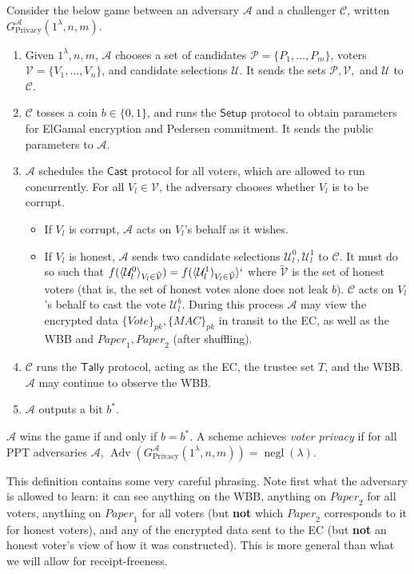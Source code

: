 \documentclass[12pt,a4paper]{article}
\DeclareMathOperator{\negl}{\text{negl}}
\DeclareMathOperator{\Adv}{\text{Adv}}
\theoremstyle{definition}
\newcommand{\Vote}{\mathit{Vote}}
\newcommand{\Paper}{\mathit{Paper}}
\newcommand{\Mac}{\mathit{MAC}}
\begin{document}
\begin{definition}
    Consider the below game between an adversary $\mathcal{A}$ and a challenger $\mathcal{C}$, written $G^\mathcal{A}_{\text{Privacy}}(1^\lambda, n, m)$.
    \begin{enumerate}
        \item Given $1^\lambda, n, m$, $\mathcal{A}$ chooses a set of candidates $\mathcal{P}=\{P_1,\ldots,P_m\}$, voters $\mathcal{V}=\{V_1,\ldots,V_n\}$, and candidate selections $\mathcal{U}$. It sends the sets $\mathcal{P}, \mathcal{V},$ and $\mathcal{U}$ to $\mathcal{C}$.
        \item $\mathcal{C}$ tosses a coin $b\in\{0, 1\}$, and runs the $\mathsf{Setup}$ protocol to obtain parameters for ElGamal encryption and Pedersen commitment. It sends the public parameters to $\mathcal{A}$.
        \item $\mathcal{A}$ schedules the $\mathsf{Cast}$ protocol for all voters, which are allowed to run concurrently. For all $V_l\in\mathcal{V}$, the adversary chooses whether $V_l$ is to be corrupt.
        \begin{itemize}
            \item If $V_l$ is corrupt, $\mathcal{A}$ acts on $V_l$'s behalf as it wishes.
            \item If $V_l$ is honest, $\mathcal{A}$ sends two candidate selections $\mathcal{U}_l^0, \mathcal{U}_l^1$ to $\mathcal{C}$. It must do so such that $f(\langle\mathcal{U}_l^0\rangle_{V_l\in \tilde{\mathcal{V}}})=f(\langle\mathcal{U}^1_l)_{V_l\in \tilde{\mathcal{V}}}\rangle`$ where $\tilde{\mathcal{V}}$ is the set of honest voters (that is, the set of honest votes alone does not leak $b$). $\mathcal{C}$ acts on $V_l$'s behalf to cast the vote $\mathcal{U}_l^b$. During this process $\mathcal{A}$ may view the encrypted data $\{\Vote\}_{\mathit{pk}}, \{\Mac\}_{\mathit{pk}}$ in transit to the EC, as well as the WBB and $\Paper_1, \Paper_2$ (after shuffling).
        \end{itemize}
        \item $\mathcal{C}$ runs the $\mathsf{Tally}$ protocol, acting as the EC, the trustee set $T$, and the WBB. $\mathcal{A}$ may continue to observe the WBB.
        \item $\mathcal{A}$ outputs a bit $b^*$.
    \end{enumerate}
    $\mathcal{A}$ wins the game if and only if $b=b^*$. A scheme achieves \textit{voter privacy} if for all PPT adversaries $\mathcal{A}$, $\Adv\left(G^\mathcal{A}_{\text{Privacy}}(1^\lambda, n, m)\right)=\negl(\lambda)$.
\end{definition}
This definition contains some very careful phrasing. Note first what the adversary is allowed to learn: it can see anything on the WBB, anything on $\Paper_2$ for all voters, anything on $\Paper_1$ for all voters (but \textbf{not} which $\Paper_2$ corresponds to it for honest voters), and any of the encrypted data sent to the EC (but \textbf{not} an honest voter's view of how it was constructed). This is more general than what we will allow for receipt-freeness.
\end{document}
